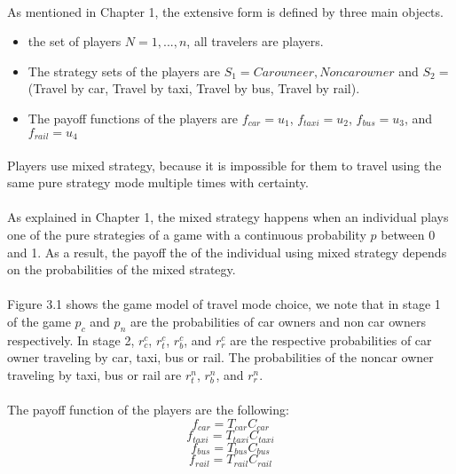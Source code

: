\paragraph{} As mentioned in Chapter 1, the extensive form is defined by three  main objects.
\begin{itemize}
\item the set of players $N = {1,...,n}$, all travelers are players.
\item The strategy sets of the players are $S_1 = {Car owneer, Noncar owner}$ and $ S_2 = $(Travel by car, Travel by taxi, Travel by bus, Travel by rail).
\item The payoff functions of the players are $f_{car} = u_1$, $f_{taxi} = u_2$, $f_{bus} = u_3$, and $f_{rail} = u_4$
\end{itemize}
\paragraph{}Players use mixed strategy, because it is impossible for them to travel using the same pure strategy mode multiple times with certainty.
\paragraph{}As explained in Chapter 1, the mixed strategy happens when an individual plays one of the pure strategies of a game with a continuous probability $p$ between 0 and 1. As a result, the payoff the of the individual using mixed strategy depends on the probabilities of the mixed strategy.
\paragraph{}Figure 3.1 shows the game model of travel mode choice, we note that in stage 1 of the game $p_c$ and $p_n$ are the probabilities of car owners and non car owners respectively. In stage 2, $r^c_{c}$, $r^{c}_{t}$, $r^c_{b}$, and $r^c_{r}$ are the respective probabilities of car owner traveling by car, taxi, bus or rail. The probabilities of the noncar owner traveling by taxi, bus or rail are $r^n_{t}$, $r^n_{b}$, and $r^n_{r}$.
\paragraph{}The payoff function of the players are the following: 
\begin{equation}
f_{car} = T_{car} C_{car}
\end{equation}
\begin{equation}
f_{taxi} = T_{taxi} C_{taxi}
\end{equation}
\begin{equation}
f_{bus} = T_{bus} C_{bus}
\end{equation}
\begin{equation}
f_{rail} = T_{rail} C_{rail}
\end{equation}
